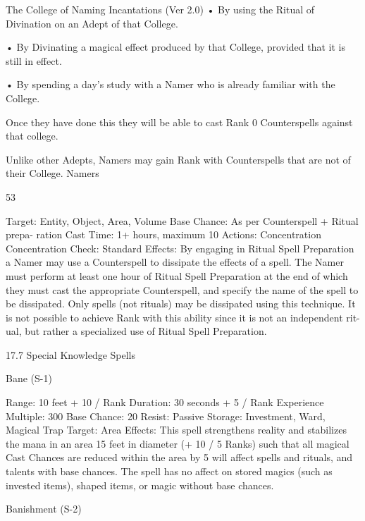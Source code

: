 \begin{Chapter}{The College of Naming Incantations (Ver 2.0)}
• By using the Ritual of Divination on an Adept of 
that College.  

•  By  Divinating  a  magical  effect  produced  by  that 
College, provided that it is still in effect.  

•  By  spending  a day’s  study  with  a Namer  who  is 
already familiar with the College. 

Once they have done this they  will be able to cast 
Rank 0 Counterspells against that college. 

Unlike  other  Adepts,  Namers  may  gain  Rank  with 
Counterspells that are not of their College. Namers 

53 

Target: Entity, Object, Area, Volume 
Base Chance: As per Counterspell + Ritual prepa-
ration 
Cast Time: 1+ hours, maximum 10 
Actions: Concentration 
Concentration Check: Standard 
Effects:  By  engaging  in  Ritual  Spell  Preparation  a 
Namer  may  use  a  Counterspell  to  dissipate  the 
effects of a spell. The Namer must perform at least 
one  hour  of  Ritual  Spell  Preparation  at  the  end  of 
which they must cast the appropriate Counterspell, 
and specify the name of the spell to  be dissipated. 
Only  spells  (not  rituals)  may  be  dissipated  using 
this  technique.  It  is  not  possible  to  achieve  Rank 
with  this  ability  since  it  is  not  an  independent  rit-
ual,  but  rather  a  specialized  use  of  Ritual  Spell 
Preparation. 

17.7 Special Knowledge Spells 

Bane (S-1) 

Range: 10 feet + 10 / Rank 
Duration: 30 seconds + 5 / Rank 
Experience Multiple: 300 
Base Chance: 20%
Resist: Passive 
Storage: Investment, Ward, Magical Trap 
Target: Area 
Effects: This spell strengthens reality and stabilizes 
the  mana  in  an  area  15  feet  in  diameter  (+  10  /  5 
Ranks)  such  that  all  magical  Cast  Chances  are 
reduced  within  the  area  by  5%
will  affect  spells  and  rituals, and  talents  with  base 
chances.  The  spell  has  no  affect  on  stored  magics 
(such  as  invested  items),  shaped  items,  or  magic 
without base chances. 

Banishment (S-2) 


\end{Chapter}
